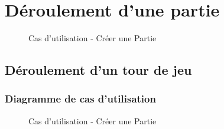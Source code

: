\documentclass[a4paper,11pt]{article}
\begin{document}
\section{Déroulement d'une partie}
\lipsum[1]
\begin{figure}[ht!]
\caption{Cas d'utilisation - Créer une Partie}
\end{figure}
\newpage
\subsection{Déroulement d'un tour de jeu}
\lipsum[1]
\subsubsection{Diagramme de cas d'utilisation}
\begin{figure}[ht!]
\caption{Cas d'utilisation - Créer une Partie}
\end{figure}
\newpage
\end{document}
